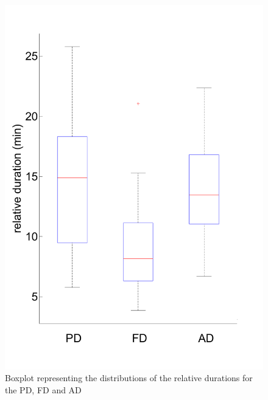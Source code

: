 \documentclass{aes2e}
\begin{document}
\begin{figure}[t]
\begin{center}
\includegraphics[scale=0.36]{gfx/RDbis.pdf} 
\end{center}
\caption{\label{fig1} Boxplot representing the distributions of the relative durations for the PD, FD and AD}
\end{figure}  
\end{document}
